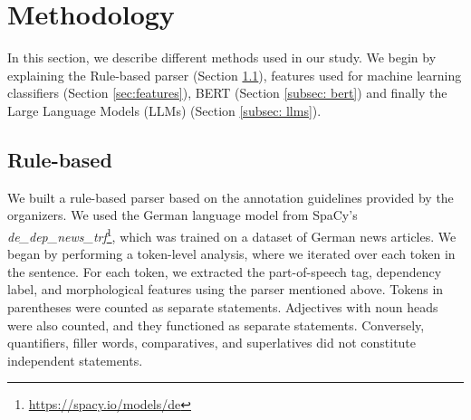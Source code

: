 \documentclass[11pt]{article}
\begin{document}

% 


\section{Methodology}\label{sec: methodology}

In this section, we describe different methods used in our study. We begin by explaining the Rule-based parser (Section \ref{subsec: rule-based}), features used for machine learning classifiers (Section \ref{sec:features}), BERT (Section \ref{subsec: bert}) and finally the Large Language Models (LLMs) (Section \ref{subsec: llms}).


\subsection{Rule-based}\label{subsec: rule-based}

We built a rule-based parser based on the annotation guidelines provided by the organizers. We used the German language model from SpaCy's \textit{de\_dep\_news\_trf}\footnote{\url{https://spacy.io/models/de}}, which was trained on a dataset of German news articles. We began by performing a token-level analysis, where we iterated over each token in the sentence. For each token, we extracted the part-of-speech tag, dependency label, and morphological features using the parser mentioned above. Tokens in parentheses were counted as separate statements. Adjectives with noun heads were also counted, and they functioned as separate statements. Conversely, quantifiers, filler words, comparatives, and superlatives did not constitute independent statements.
\end{document}
